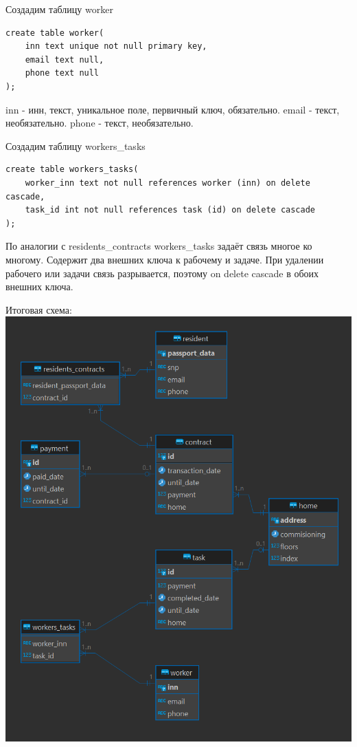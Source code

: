 \documentclass[a4paper,14pt]{extarticle}
\begin{document}
\begin{enumerate}[1.]
Создадим таблицу worker
\begin{verbatim}
create table worker(
    inn text unique not null primary key,
    email text null,
    phone text null
);
\end{verbatim}
inn - инн, текст, уникальное поле, первичный ключ, обязательно.
email - текст, необязательно.
phone - текст, необязательно.

Создадим таблицу workers\_tasks
\begin{verbatim}
create table workers_tasks(
    worker_inn text not null references worker (inn) on delete cascade,
    task_id int not null references task (id) on delete cascade
);
\end{verbatim}
По аналогии с residents\_contracts workers\_tasks задаёт 
связь многое ко многому. Содержит два внешних ключа к рабочему и задаче.
При удалении рабочего или задачи связь разрывается, поэтому on delete cascade 
в обоих внешних ключа.\bigbreak

Итоговая схема:\\
\includegraphics[width=140mm]{schema}


\end{enumerate}
\end{document}
